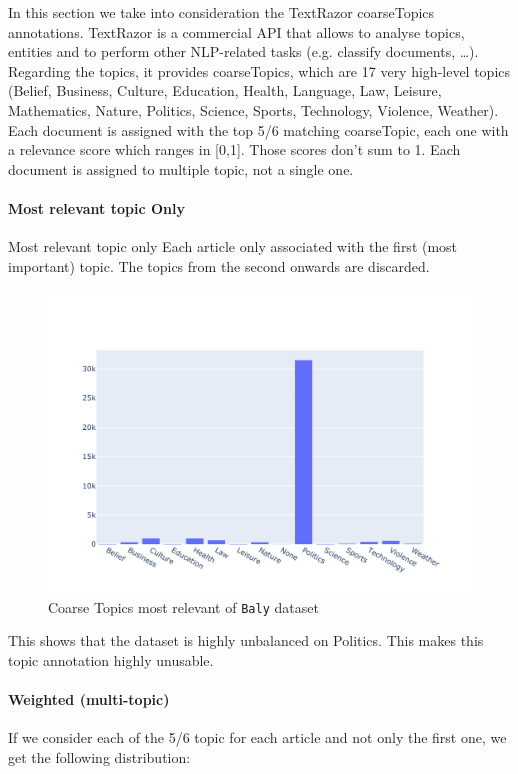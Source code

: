 In this section we take into consideration the TextRazor coarseTopics annotations. TextRazor is a commercial API that allows to analyse topics, entities and to perform other NLP-related tasks (e.g. classify documents, …).
Regarding the topics, it provides coarseTopics, which are 17 very high-level topics (Belief, Business, Culture, Education, Health, Language, Law, Leisure, Mathematics, Nature, Politics, Science, Sports, Technology, Violence, Weather).
Each document is assigned with the top 5/6 matching coarseTopic, each one with a relevance score which ranges in [0,1]. Those scores don’t sum to 1. Each document is assigned to multiple topic, not a single one.

\paragraph{Most relevant topic Only}

Most relevant topic only
Each article only associated with the first (most important) topic. The topics from the second onwards are discarded.

\begin{figure}[!htbp]
    \centering
    \includegraphics[width=\linewidth]{figures/baly_coarse_first.pdf}
    \caption{Coarse Topics most relevant of \texttt{Baly} dataset}
    \label{fig:baly_coarse_first}
\end{figure}

This shows that the dataset is highly unbalanced on Politics. This makes this topic annotation highly unusable.

\paragraph{Weighted (multi-topic)}
If we consider each of the 5/6 topic for each article and not only the first one, we get the following distribution:

